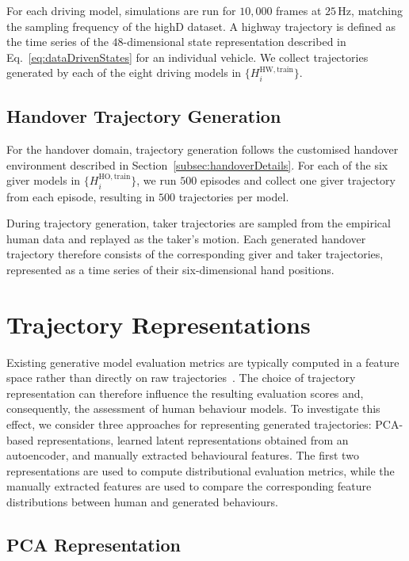 \documentclass[journal]{IEEEtran}
\begin{document}
For each driving model, simulations are run for $10{,}000$ frames at $25\,\mathrm{Hz}$, matching the sampling frequency of the highD dataset. A highway trajectory is defined as the time series of the $48$-dimensional state representation described in Eq.~\ref{eq:dataDrivenStates} for an individual vehicle. We collect trajectories generated by each of the eight driving models in $\{H_i^{\mathrm{HW,train}}\}$.

\subsection{Handover Trajectory Generation}

For the handover domain, trajectory generation follows the customised handover environment described in Section~\ref{subsec:handoverDetails}. For each of the six giver models in $\{H_i^{\mathrm{HO,train}}\}$, we run $500$ episodes and collect one giver trajectory from each episode, resulting in $500$ trajectories per model.

During trajectory generation, taker trajectories are sampled from the empirical human data and replayed as the taker's motion. Each generated handover trajectory therefore consists of the corresponding giver and taker trajectories, represented as a time series of their six-dimensional hand positions.

\section{Trajectory Representations}\label{sec:trajectoryRepresentations}

Existing generative model evaluation metrics are typically computed in a feature space rather than directly on raw trajectories~\cite{Ali2025}. The choice of trajectory representation can therefore influence the resulting evaluation scores and, consequently, the assessment of human behaviour models. To investigate this effect, we consider three approaches for representing generated trajectories: PCA-based representations, learned latent representations obtained from an autoencoder, and manually extracted behavioural features. The first two representations are used to compute distributional evaluation metrics, while the manually extracted features are used to compare the corresponding feature distributions between human and generated behaviours.

\subsection{PCA Representation}
\end{document}
